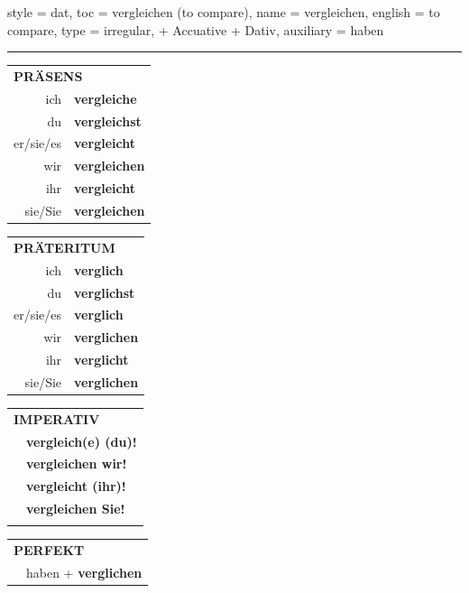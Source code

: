 \begin{verbentry}{
  style = {dat},
  toc = {vergleichen (to compare)},
  name = {vergleichen},
  english = {to compare},
  type = {irregular, + Accuative + Dativ},
  auxiliary = {haben}
}
 
    
     \vspace{5pt}

    \hrule
    
    \vspace{5pt}

  \begin{tabular}{rl}
     \multicolumn{2}{l}{\textbf{PRÄSENS} }\\
    ich & \textbf{vergleiche}\\
    du & \textbf{vergleichst}\\
    er/sie/es & \textbf{vergleicht}\\
    wir & \textbf{vergleichen}\\
    ihr & \textbf{vergleicht}\\
    sie/Sie & \textbf{vergleichen}\\
  \end{tabular}
  \hfill
     \begin{tabular}{rl}
    \multicolumn{2}{l}{\textbf{PRÄTERITUM} }\\
    ich & \textbf{verglich}\\
    du & \textbf{verglichst}\\
    er/sie/es & \textbf{verglich}\\
    wir & \textbf{verglichen}\\
    ihr & \textbf{verglicht}\\
    sie/Sie & \textbf{verglichen}\\
  \end{tabular}
  \hfill
  \begin{tabular}{rl}
     \multicolumn{2}{l}{\textbf{IMPERATIV} }\\
   & \textbf{vergleich(e) (du)!}\\
   & \textbf{vergleichen wir!}\\
   & \textbf{vergleicht (ihr)!}\\
   & \textbf{vergleichen Sie!}\\
   & \vspace{10pt}
  \end{tabular}

    \vspace{10pt}

 \begin{tabular}{rl}
     \multicolumn{2}{l}{\textbf{PERFEKT}}\\
  &  haben + \textbf{verglichen}\\
  \end{tabular}
\hfill
   \begin{tabular}{rl}
   

\end{tabular}
\end{verbentry}
